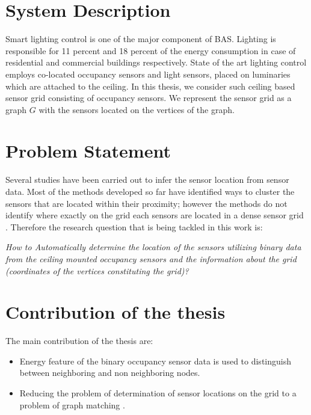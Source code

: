 \section{System Description}
Smart lighting control is one of the major component of BAS. Lighting is responsible for 11 percent  and 18 percent of the energy consumption in case of residential and commercial buildings respectively\cite{website}. 
State of the art lighting control employs co-located occupancy sensors and light sensors, placed on luminaries which are attached to the ceiling\cite{pandharipande2015smart,caicedo2016smart,van2014distributed}.
In this thesis, we consider such ceiling based sensor grid consisting of occupancy sensors. We represent the sensor grid as a graph $G$ with the sensors located on the vertices of the graph.

\section{Problem Statement}

Several studies \cite{Hong:2013:TAS:2528282.2528302,doi:10.1061/9780784413616.226,Koc:2014:CLC:2674061.2674075,Lu:2014:SBS:2648771.2629441,ellis2012creating,muller2014automated,marinakis2005learning} have been carried out to infer the sensor location from sensor data. Most of the methods developed so far have identified ways to cluster the sensors that are located within their proximity; however the methods do not identify where exactly on the grid each sensors are located in a dense sensor grid \cite{Hong:2013:TAS:2528282.2528302,doi:10.1061/9780784413616.226,Koc:2014:CLC:2674061.2674075}.  Therefore the research question that is being tackled in this work is:

\textit{How to Automatically determine the location of the sensors utilizing binary data from the ceiling mounted occupancy sensors and the information about the grid (coordinates of the vertices constituting the grid)?}

\section{Contribution of the thesis}
The main contribution of the thesis are:
\begin{itemize}
\item Energy feature of the binary occupancy sensor data is used to distinguish between neighboring and non neighboring nodes.
\item Reducing the problem of determination of sensor locations  on the grid to a problem of graph matching \cite{conte2004thirty}.
\end{itemize}

